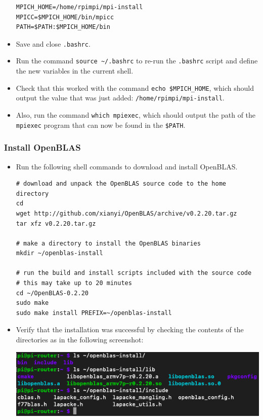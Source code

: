 \documentclass{article}
\newcommand{\tttilde}[0]{\textasciitilde{}}
\begin{document}
\begin{itemize}
\begin{verbatim}
MPICH_HOME=/home/rpimpi/mpi-install
MPICC=$MPICH_HOME/bin/mpicc
PATH=$PATH:$MPICH_HOME/bin
\end{verbatim}

    \item Save and close \texttt{.bashrc}. 
    
    \item Run the command \texttt{source \tttilde/.bashrc} to re-run the \texttt{.bashrc} script and define the new variables in the current shell. 
    
    \item Check that this worked with the command \texttt{echo \$MPICH\_HOME}, which should output the value that was just added: \texttt{/home/rpimpi/mpi-install}.
    
    \item Also, run the command \texttt{which mpiexec}, which should output the path of the \texttt{mpiexec} program that can now be found in the \texttt{\$PATH}.

\end{itemize}

\subsubsection{Install OpenBLAS}
\begin{itemize}
    \item Run the following shell commands to download and install OpenBLAS.
\begin{verbatim}
# download and unpack the OpenBLAS source code to the home directory
cd
wget http://github.com/xianyi/OpenBLAS/archive/v0.2.20.tar.gz
tar xfz v0.2.20.tar.gz

# make a directory to install the OpenBLAS binaries
mkdir ~/openblas-install

# run the build and install scripts included with the source code
# this may take up to 20 minutes
cd ~/OpenBLAS-0.2.20
sudo make
sudo make install PREFIX=~/openblas-install
\end{verbatim}    

    \item Verify that the installation was successful by checking the contents of the directories as in the following screenshot:
    
    \includegraphics[width=\textwidth]{images/openblas-after-install.png}
\end{itemize}
\end{document}
